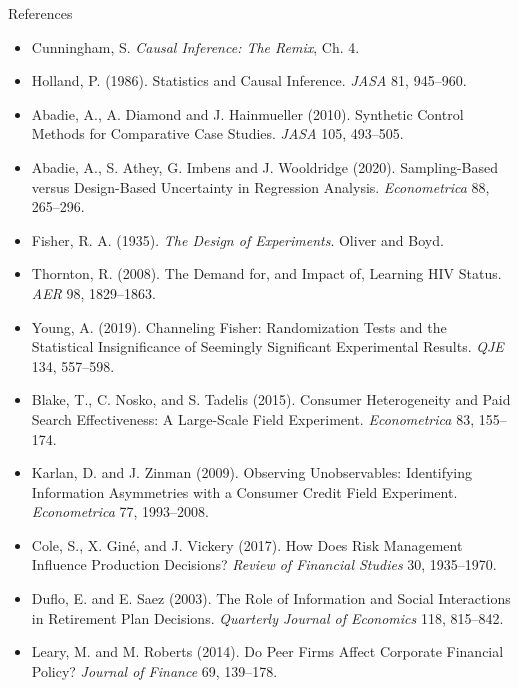 \documentclass[
  11pt,
  ignorenonframetext,
  aspectratio=169,
]{beamer}
\providecommand{\tightlist}{%
  \setlength{\itemsep}{0pt}\setlength{\parskip}{0pt}}
\begin{document}
\begin{frame}{References}
\protect{}\label{references}
\footnotesize

\begin{itemize}
\tightlist
\item
  Cunningham, S. \emph{Causal Inference: The Remix}, Ch. 4.
\item
  Holland, P. (1986). Statistics and Causal Inference. \emph{JASA} 81,
  945--960.
\item
  Abadie, A., A. Diamond and J. Hainmueller (2010). Synthetic Control
  Methods for Comparative Case Studies. \emph{JASA} 105, 493--505.
\item
  Abadie, A., S. Athey, G. Imbens and J. Wooldridge (2020).
  Sampling-Based versus Design-Based Uncertainty in Regression Analysis.
  \emph{Econometrica} 88, 265--296.
\item
  Fisher, R. A. (1935). \emph{The Design of Experiments}. Oliver and
  Boyd.
\item
  Thornton, R. (2008). The Demand for, and Impact of, Learning HIV
  Status. \emph{AER} 98, 1829--1863.
\item
  Young, A. (2019). Channeling Fisher: Randomization Tests and the
  Statistical Insignificance of Seemingly Significant Experimental
  Results. \emph{QJE} 134, 557--598.
\item
  Blake, T., C. Nosko, and S. Tadelis (2015). Consumer Heterogeneity and
  Paid Search Effectiveness: A Large-Scale Field Experiment.
  \emph{Econometrica} 83, 155--174.
\item
  Karlan, D. and J. Zinman (2009). Observing Unobservables: Identifying
  Information Asymmetries with a Consumer Credit Field Experiment.
  \emph{Econometrica} 77, 1993--2008.
\item
  Cole, S., X. Giné, and J. Vickery (2017). How Does Risk Management
  Influence Production Decisions? \emph{Review of Financial Studies} 30,
  1935--1970.
\item
  Duflo, E. and E. Saez (2003). The Role of Information and Social
  Interactions in Retirement Plan Decisions. \emph{Quarterly Journal of
  Economics} 118, 815--842.
\item
  Leary, M. and M. Roberts (2014). Do Peer Firms Affect Corporate
  Financial Policy? \emph{Journal of Finance} 69, 139--178.
\end{itemize}
\end{frame}
\end{document}
